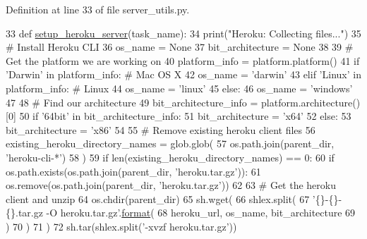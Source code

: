 Definition at line 33 of file server\+\_\+utils.\+py.


\begin{DoxyCode}
33 \textcolor{keyword}{def }\hyperlink{namespaceparlai_1_1mturk_1_1core_1_1server__utils_af1c97e9b93a403e200ac75b87a51c3c1}{setup\_heroku\_server}(task\_name):
34     print(\textcolor{stringliteral}{"Heroku: Collecting files..."})
35     \textcolor{comment}{# Install Heroku CLI}
36     os\_name = \textcolor{keywordtype}{None}
37     bit\_architecture = \textcolor{keywordtype}{None}
38 
39     \textcolor{comment}{# Get the platform we are working on}
40     platform\_info = platform.platform()
41     \textcolor{keywordflow}{if} \textcolor{stringliteral}{'Darwin'} \textcolor{keywordflow}{in} platform\_info:  \textcolor{comment}{# Mac OS X}
42         os\_name = \textcolor{stringliteral}{'darwin'}
43     \textcolor{keywordflow}{elif} \textcolor{stringliteral}{'Linux'} \textcolor{keywordflow}{in} platform\_info:  \textcolor{comment}{# Linux}
44         os\_name = \textcolor{stringliteral}{'linux'}
45     \textcolor{keywordflow}{else}:
46         os\_name = \textcolor{stringliteral}{'windows'}
47 
48     \textcolor{comment}{# Find our architecture}
49     bit\_architecture\_info = platform.architecture()[0]
50     \textcolor{keywordflow}{if} \textcolor{stringliteral}{'64bit'} \textcolor{keywordflow}{in} bit\_architecture\_info:
51         bit\_architecture = \textcolor{stringliteral}{'x64'}
52     \textcolor{keywordflow}{else}:
53         bit\_architecture = \textcolor{stringliteral}{'x86'}
54 
55     \textcolor{comment}{# Remove existing heroku client files}
56     existing\_heroku\_directory\_names = glob.glob(
57         os.path.join(parent\_dir, \textcolor{stringliteral}{'heroku-cli-*'})
58     )
59     \textcolor{keywordflow}{if} len(existing\_heroku\_directory\_names) == 0:
60         \textcolor{keywordflow}{if} os.path.exists(os.path.join(parent\_dir, \textcolor{stringliteral}{'heroku.tar.gz'})):
61             os.remove(os.path.join(parent\_dir, \textcolor{stringliteral}{'heroku.tar.gz'}))
62 
63         \textcolor{comment}{# Get the heroku client and unzip}
64         os.chdir(parent\_dir)
65         sh.wget(
66             shlex.split(
67                 \textcolor{stringliteral}{'\{\}-\{\}-\{\}.tar.gz -O heroku.tar.gz'}.\hyperlink{namespaceparlai_1_1chat__service_1_1services_1_1messenger_1_1shared__utils_a32e2e2022b824fbaf80c747160b52a76}{format}(
68                     heroku\_url, os\_name, bit\_architecture
69                 )
70             )
71         )
72         sh.tar(shlex.split(\textcolor{stringliteral}{'-xvzf heroku.tar.gz'}))

\end{DoxyCode}
